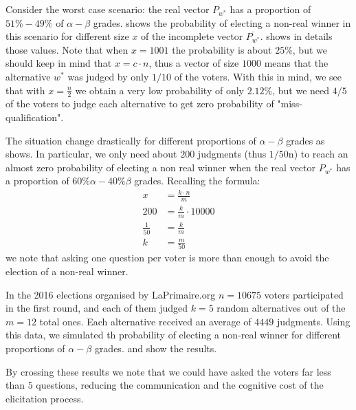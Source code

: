 \documentclass[version=3.21, pagesize, twoside=off, bibliography=totoc, DIV=calc, fontsize=12pt, a4paper]{scrartcl}
\begin{document}
Consider the worst case scenario: the real vector $P_{w^*}$ has a proportion of $51\%-49\%$ of $\alpha-\beta$ grades.  shows the probability of electing a non-real winner in this scenario for different size $x$ of the incomplete vector $\overline{P_{w^*}}$.  shows in details those values. Note that when $x=1001$ the probability is about $25\%$, but we should keep in mind that $x= c \cdot n$, thus a vector of size $1000$ means that the alternative $w^*$ was judged by only $1/10$ of the voters. With this in mind, we see that with $x=\frac{n}{2}$ we obtain a very low probability of only $2.12\%$, but we need $4/5$ of the voters to judge each alternative to get zero probability of "miss-qualification".

The situation change drastically for different proportions of $\alpha-\beta$ grades as  shows. In particular, we only need about $200$ judgments (thus $1/50$n) to reach an almost zero probability of electing a non real winner when the real vector $P_{w^*}$ has a proportion of $60\% \alpha -40\% \beta$ grades. Recalling the formula:
\begin{align}
	x&=\frac{k \cdot n}{m} \\
	200&=\frac{k}{m}\cdot 10000 \\
	\frac{1}{50}&=\frac{k}{m} \\
	k&=\frac{m}{50}
\end{align}
we note that asking one question per voter is more than enough to avoid the election of a non-real winner.

In the 2016 elections organised by LaPrimaire.org $n=10675$ voters participated in the first round, and each of them judged $k=5$ random alternatives out of the $m=12$ total ones. Each alternative received an average of $4449$ judgments. Using this data, we simulated th probability of electing a non-real winner for different proportions of $\alpha-\beta$ grades.  and  show the results.

By crossing these results we note that we could have asked the voters far less than $5$ questions, reducing the communication and the cognitive cost of the elicitation process.
\end{document}
